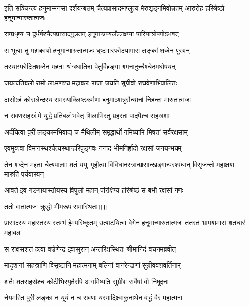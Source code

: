 \threelineshloka
{इति सञ्चिन्त्य हनुमान्मनसा दर्शयन्बलम्}
{चैत्यप्रासादमाप्लुत्य मेरुशृङ्गमिवोन्नतम्}
{आरुरोह हरिश्रेष्ठो हनूमान्मारुतात्मजः} %

\twolineshloka
{सम्प्रधृष्य च दुर्धर्षश्चैत्यप्रासादमुन्नतम्}
{हनूमान्प्रज्वलँल्लक्ष्म्या पारियात्रोपमोऽभवत्} %

\twolineshloka
{स भूत्वा तु महाकायो हनूमान्मारुतात्मजः}
{धृष्टमास्फोटयामास लङ्कां शब्देन पूरयन्} %

\twolineshloka
{तस्यास्फोटितशब्देन महता श्रोत्रघातिना}
{पेतुर्विहङ्गा गगनादुच्चैश्चेदमघोषयत्} %

\twolineshloka
{जयत्यतिबलो रामो लक्ष्मणश्च महाबलः}
{राजा जयति सुग्रीवो राघवेणाभिपालितः} %

\twolineshloka
{दासोऽहं कोसलेन्द्रस्य रामस्याक्लिष्टकर्मणः}
{हनुमाञ्शत्रुसैन्यानां निहन्ता मारुतात्मजः} %

\twolineshloka
{न रावणसहस्रं मे युद्धे प्रतिबलं भवेत्}
{शिलाभिस्तु प्रहरतः पादपैश्च सहस्रशः} %

\twolineshloka
{अर्दयित्वा पुरीं लङ्कामभिवाद्य च मैथिलीम्}
{समृद्धार्थो गमिष्यामि मिषतां सर्वरक्षसाम्} %

\twolineshloka
{एवमुक्त्वा विमानस्थश्चैत्यस्थान्हरिपुङ्गवः}
{ननाद भीमनिर्ह्रादो रक्षसां जनयन्भयम्} %

\threelineshloka
{तेन शब्देन महता चैत्यपालाः शतं ययुः}
{गृहीत्वा विविधानस्त्रान्प्रासान्खड्गान्परश्वधान्}
{विसृजन्तो महाक्षया मारुतिं पर्यवारयन्} %

\twolineshloka
{आवर्त इव गङ्गायास्तोयस्य विपुलो महान्}
{परिक्षिप्य हरिश्रेष्ठं स बभौ रक्षसां गणः} %

{ततो वातात्मजः क्रुद्धो भीमरूपं समास्थितः॥॥} %

\addtocounter{shlokacount}{1}

\threelineshloka
{प्रासादस्य महांस्तस्य स्तम्भं हेमपरिष्कृतम्}
{उत्पाटयित्वा वेगेन हनूमान्मारुतात्मजः}
{ततस्तं भ्रामयामास शतधारं महाबलः} %

\twolineshloka
{स राक्षसशतं हत्वा वज्रेणेन्द्र इवासुरान्}
{अन्तरिक्षस्थितः श्रीमानिदं वचनमब्रवीत्} %

\twolineshloka
{मादृशानां सहस्राणि विसृष्टानि महात्मनाम्}
{बलिनां वानरेन्द्राणां सुग्रीववशवर्तिनाम्} %

\twolineshloka
{शतैः शतसहस्रैश्च कोटीभिरयुतैरपि}
{आगमिष्यति सुग्रीवः सर्वेषां वो निषूदनः} %

\twolineshloka
{नेयमस्ति पुरी लङ्का न यूयं न च रावणः}
{यस्मादिक्ष्वाकुनाथेन बद्धं वैरं महात्मना} %


